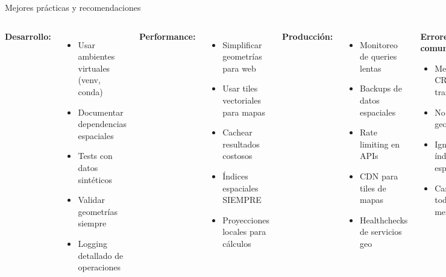 \documentclass[10pt,aspectratio=169]{beamer}
\begin{document}
\begin{frame}{Mejores prácticas y recomendaciones}
    \begin{columns}[T]
        \textbf{Desarrollo:}
        \begin{itemize}
            \item Usar ambientes virtuales (venv, conda)
            \item Documentar dependencias espaciales
            \item Tests con datos sintéticos
            \item Validar geometrías siempre
            \item Logging detallado de operaciones
        \end{itemize}
        
        \vspace{0.3cm}
        \textbf{Performance:}
        \begin{itemize}
            \item Simplificar geometrías para web
            \item Usar tiles vectoriales para mapas
            \item Cachear resultados costosos
            \item Índices espaciales SIEMPRE
            \item Proyecciones locales para cálculos
        \end{itemize}
        
        \textbf{Producción:}
        \begin{itemize}
            \item Monitoreo de queries lentas
            \item Backups de datos espaciales
            \item Rate limiting en APIs
            \item CDN para tiles de mapas
            \item Healthchecks de servicios geo
        \end{itemize}
        
        \vspace{0.3cm}
        \begin{tcolorbox}[colframe=usachred,colback=red!5]
        \textbf{Errores comunes:}
        \begin{itemize}
            \item Mezclar CRS sin transformar
            \item No validar geometrías
            \item Ignorar índices espaciales
            \item Cargar todo en memoria
        \end{itemize}
        \end{tcolorbox}
    \end{columns}
\end{frame}
\end{document}
